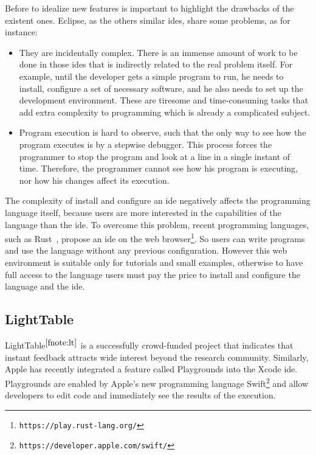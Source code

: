 Before to idealize new features is important to highlight the drawbacks of the existent ones. Eclipse, as the others similar \glspl{ide}, share some problems, as for instance:

\begin{itemize}
    \item They are incidentally complex. There is an immense amount of work to be done in those \glspl{ide} that is indirectly related to the real problem itself. For example, until the developer gets a simple program to run, he needs to install, configure a set of necessary software, and he also needs to set up the development environment. These are tiresome and time-consuming tasks that add extra complexity to programming which is already a complicated subject.

    \item Program execution is hard to observe, such that the only way to see how the program executes is by a stepwise debugger. This process forces the programmer to stop the program and look at a line in a single instant of time. Therefore, the programmer cannot see how his program is executing, nor how his changes affect its execution.
\end{itemize}

The complexity of install and configure an \gls{ide} negatively affects the programming language itself, because users are more interested in the capabilities of the language than the \gls{ide}. To overcome this problem, recent programming languages, such as Rust~\citep{matsakis2014rust}, propose an \gls{ide} on the web browser\footnote{\texttt{https://play.rust-lang.org/}}. So users can write programs and use the language without any previous configuration. However this web environment is suitable only for tutorials and small examples, otherwise to have full access to the language users must pay the price to install and configure the language and the \gls{ide}.

\subsection{LightTable}
\label{subsec:lighttable}
LightTable$^{\ref{fnote:lt}}$ is a successfully crowd-funded project that indicates that instant feedback attracts wide interest beyond the research community. Similarly, Apple has recently integrated a feature called Playgrounds into the Xcode \gls{ide}. Playgrounds are enabled by Apple's new programming language Swift\footnote{\texttt{https://developer.apple.com/swift/}} and allow developers to edit code and immediately see the results of the execution.

